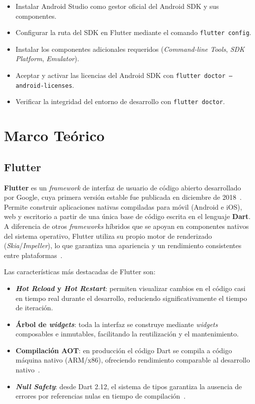 \documentclass[12pt,a4paper]{article}
\begin{document}
\begin{itemize}
  \item Instalar Android Studio como gestor oficial del Android SDK y sus componentes.
  \item Configurar la ruta del SDK en Flutter mediante el comando \texttt{flutter config}.
  \item Instalar los componentes adicionales requeridos (\textit{Command-line Tools}, \textit{SDK Platform}, \textit{Emulator}).
  \item Aceptar y activar las licencias del Android SDK con \texttt{flutter doctor --android-licenses}.
  \item Verificar la integridad del entorno de desarrollo con \texttt{flutter doctor}.
\end{itemize}

\section{Marco Teórico}

\subsection{Flutter}

\textbf{Flutter} es un \textit{framework} de interfaz de usuario de código abierto desarrollado por Google, cuya primera versión estable fue publicada en diciembre de 2018~\cite{flutter2024}. Permite construir aplicaciones nativas compiladas para móvil (Android e iOS), web y escritorio a partir de una única base de código escrita en el lenguaje \textbf{Dart}. A diferencia de otros \textit{frameworks} híbridos que se apoyan en componentes nativos del sistema operativo, Flutter utiliza su propio motor de renderizado (\textit{Skia}/\textit{Impeller}), lo que garantiza una apariencia y un rendimiento consistentes entre plataformas~\cite{windmill2020}.

Las características más destacadas de Flutter son:

\begin{itemize}
  \item \textbf{\textit{Hot Reload} y \textit{Hot Restart}}: permiten visualizar cambios en el código casi en tiempo real durante el desarrollo, reduciendo significativamente el tiempo de iteración.
  \item \textbf{Árbol de \textit{widgets}}: toda la interfaz se construye mediante \textit{widgets} composables e inmutables, facilitando la reutilización y el mantenimiento.
  \item \textbf{Compilación AOT}: en producción el código Dart se compila a código máquina nativo (ARM/x86), ofreciendo rendimiento comparable al desarrollo nativo~\cite{dart2024}.
  \item \textbf{\textit{Null Safety}}: desde Dart 2.12, el sistema de tipos garantiza la ausencia de errores por referencias nulas en tiempo de compilación~\cite{dart2024}.
\end{itemize}
\end{document}
